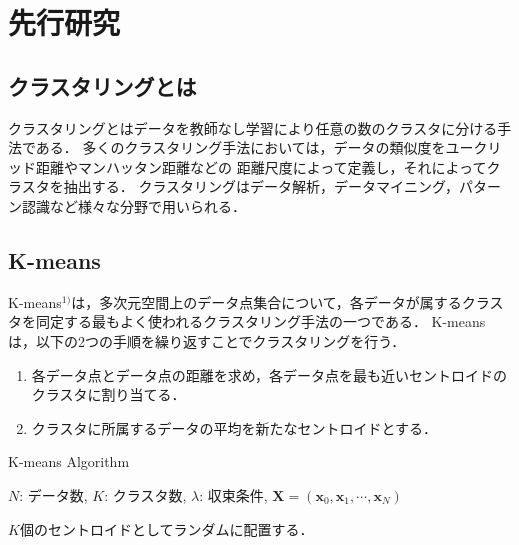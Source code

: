 \section{先行研究}

\subsection{クラスタリングとは}
クラスタリングとはデータを教師なし学習により任意の数のクラスタに分ける手法である．
多くのクラスタリング手法においては，データの類似度をユークリッド距離やマンハッタン距離などの
距離尺度によって定義し，それによってクラスタを抽出する．
クラスタリングはデータ解析，データマイニング，パターン認識など様々な分野で用いられる．

\subsection{K-means}
K-means$^{1)}$は，多次元空間上のデータ点集合について，各データが属するクラスタを同定する最もよく使われるクラスタリング手法の一つである．
K-meansは，以下の2つの手順を繰り返すことでクラスタリングを行う．
\begin{enumerate}
  \item 各データ点とデータ点の距離を求め，各データ点を最も近いセントロイドのクラスタに割り当てる．
  \item クラスタに所属するデータの平均を新たなセントロイドとする．
\end{enumerate}

\begin{algorithm}
  \caption{K-means Algorithm}
  \label{alg:k-means}
  \begin{algorithmic}
    \REQUIRE
      $N$: データ数, $K$: クラスタ数, $\lambda$: 収束条件,
      ${\bm X} = ({\bm x_0}, {\bm x_1}, \cdots, {\bm x_N})$

    $K$個のセントロイドとしてランダムに配置する．
  \end{algorithmic}
\end{algorithm}


